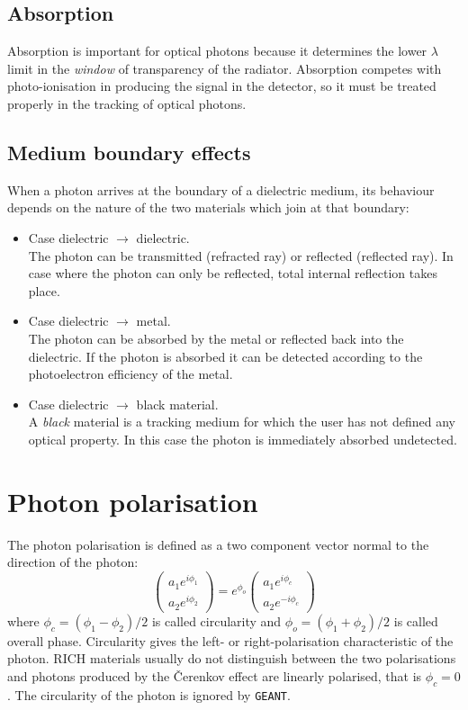 \subsection{Absorption}
Absorption is important for optical photons because it determines the
lower $\lambda$ limit in the {\it window} of transparency
of the radiator. Absorption competes with
photo-ionisation in producing the signal in the detector, so it must be
treated properly in the tracking of optical photons.

\subsection{Medium boundary effects}
When a photon arrives at the boundary of a dielectric medium,
its behaviour depends on the nature
of the two materials which join at that boundary:
\begin{itemize}
\item Case dielectric $\rightarrow$ dielectric. \\
The photon can be transmitted (refracted ray) or reflected (reflected ray).
In case where
the photon can only be reflected, total internal reflection takes place.
\item Case dielectric $\rightarrow$ metal. \\
The photon can be absorbed by the metal or reflected back into the
dielectric. If the photon is absorbed it can be detected according to the
photoelectron efficiency of the metal.
\item Case dielectric $\rightarrow$ black material. \\
A {\it black} material is a tracking medium for which the user has not
defined any optical property. In this case the photon is immediately
absorbed undetected.
\end{itemize}

\section{Photon polarisation}
The photon polarisation is defined as a two component vector normal to the
direction of the photon:
\[
\left ( \begin{array}{c}
a_{1} e^{i \phi_{1}} \\
a_{2} e^{i \phi_{2}}
\end{array} \right ) =
e^{\phi_{o}} \left (
\begin{array}{l}
a_{1} e^{i \phi_{c}} \\
a_{2} e^{-i \phi_{c}}
\end{array} \right )
\]
where
$\phi_{c} = (\phi_{1}-\phi_{2})/2$ is called circularity and
$\phi_{o} = (\phi_{1}+\phi_{2})/2$ is called overall phase. Circularity
gives the left- or right-polarisation characteristic of the photon. RICH
materials usually do not distinguish between the two polarisations and
photons produced by the \v{C}erenkov effect are linearly polarised, that is
$\phi_{c}=0$. The circularity of the photon is ignored by {\tt GEANT}.

